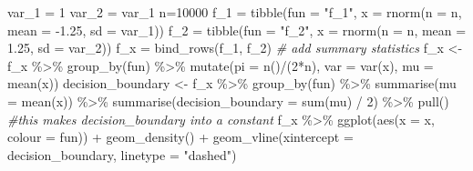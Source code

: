 \documentclass[
]{article}
\newenvironment{Shaded}{\begin{snugshade}}{\end{snugshade}}
\newcommand{\AttributeTok}[1]{\textcolor[rgb]{0.77,0.63,0.00}{#1}}
\newcommand{\CommentTok}[1]{\textcolor[rgb]{0.56,0.35,0.01}{\textit{#1}}}
\newcommand{\DecValTok}[1]{\textcolor[rgb]{0.00,0.00,0.81}{#1}}
\newcommand{\FloatTok}[1]{\textcolor[rgb]{0.00,0.00,0.81}{#1}}
\newcommand{\FunctionTok}[1]{\textcolor[rgb]{0.00,0.00,0.00}{#1}}
\newcommand{\NormalTok}[1]{#1}
\newcommand{\OtherTok}[1]{\textcolor[rgb]{0.56,0.35,0.01}{#1}}
\newcommand{\SpecialCharTok}[1]{\textcolor[rgb]{0.00,0.00,0.00}{#1}}
\newcommand{\StringTok}[1]{\textcolor[rgb]{0.31,0.60,0.02}{#1}}
\begin{document}
\begin{Shaded}
\begin{Highlighting}[]
\NormalTok{var\_1 }\OtherTok{=} \DecValTok{1}
\NormalTok{var\_2 }\OtherTok{=}\NormalTok{ var\_1}
\NormalTok{n}\OtherTok{=}\DecValTok{10000}
\NormalTok{f\_1 }\OtherTok{=} \FunctionTok{tibble}\NormalTok{(}\AttributeTok{fun =} \StringTok{"f\_1"}\NormalTok{, }\AttributeTok{x =} \FunctionTok{rnorm}\NormalTok{(}\AttributeTok{n =}\NormalTok{ n, }\AttributeTok{mean =} \SpecialCharTok{{-}}\FloatTok{1.25}\NormalTok{, }\AttributeTok{sd =}\NormalTok{ var\_1))}
\NormalTok{f\_2 }\OtherTok{=} \FunctionTok{tibble}\NormalTok{(}\AttributeTok{fun =} \StringTok{"f\_2"}\NormalTok{, }\AttributeTok{x =} \FunctionTok{rnorm}\NormalTok{(}\AttributeTok{n =}\NormalTok{ n, }\AttributeTok{mean =} \FloatTok{1.25}\NormalTok{, }\AttributeTok{sd =}\NormalTok{ var\_2))}
\NormalTok{f\_x }\OtherTok{=} \FunctionTok{bind\_rows}\NormalTok{(f\_1, f\_2)}
\CommentTok{\# add summary statistics}
\NormalTok{f\_x }\OtherTok{\textless{}{-}}\NormalTok{ f\_x }\SpecialCharTok{\%\textgreater{}\%}
  \FunctionTok{group\_by}\NormalTok{(fun) }\SpecialCharTok{\%\textgreater{}\%}
  \FunctionTok{mutate}\NormalTok{(}\AttributeTok{pi =} \FunctionTok{n}\NormalTok{()}\SpecialCharTok{/}\NormalTok{(}\DecValTok{2}\SpecialCharTok{*}\NormalTok{n),}
         \AttributeTok{var =} \FunctionTok{var}\NormalTok{(x),}
         \AttributeTok{mu =} \FunctionTok{mean}\NormalTok{(x)) }
\NormalTok{decision\_boundary }\OtherTok{\textless{}{-}}\NormalTok{ f\_x }\SpecialCharTok{\%\textgreater{}\%}
  \FunctionTok{group\_by}\NormalTok{(fun) }\SpecialCharTok{\%\textgreater{}\%}
  \FunctionTok{summarise}\NormalTok{(}\AttributeTok{mu =} \FunctionTok{mean}\NormalTok{(x)) }\SpecialCharTok{\%\textgreater{}\%}
  \FunctionTok{summarise}\NormalTok{(}\AttributeTok{decision\_boundary =} \FunctionTok{sum}\NormalTok{(mu) }\SpecialCharTok{/} \DecValTok{2}\NormalTok{) }\SpecialCharTok{\%\textgreater{}\%}
  \FunctionTok{pull}\NormalTok{()  }\CommentTok{\#this makes decision\_boundary into a constant }
\NormalTok{f\_x }\SpecialCharTok{\%\textgreater{}\%}
  \FunctionTok{ggplot}\NormalTok{(}\FunctionTok{aes}\NormalTok{(}\AttributeTok{x =}\NormalTok{ x, }\AttributeTok{colour =}\NormalTok{ fun)) }\SpecialCharTok{+}
  \FunctionTok{geom\_density}\NormalTok{() }\SpecialCharTok{+}
  \FunctionTok{geom\_vline}\NormalTok{(}\AttributeTok{xintercept =}\NormalTok{ decision\_boundary, }\AttributeTok{linetype =} \StringTok{"dashed"}\NormalTok{)}
\end{Highlighting}
\end{Shaded}
\end{document}

